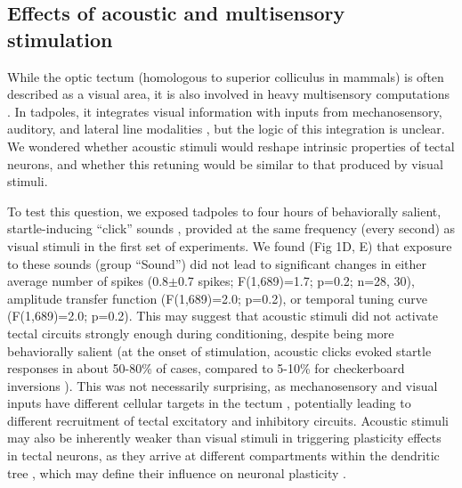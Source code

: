 \documentclass{article}
\begin{document}
\subsection*{Effects of acoustic and multisensory stimulation}

While the optic tectum (homologous to superior colliculus in mammals) is often described as a visual area, it is also involved in heavy multisensory computations \citep{stein2014}. In tadpoles, it integrates visual information with inputs from mechanosensory, auditory, and lateral line modalities \citep{deeg2009,pratt2009trigeminal,hiramoto2009,felch2016,truszkowski2017}, but the logic of this integration is unclear. We wondered whether acoustic stimuli would reshape intrinsic properties of tectal neurons, and whether this retuning would be similar to that produced by visual stimuli. 

To test this question, we exposed tadpoles to four hours of behaviorally salient, startle-inducing “click” sounds \citep{james2015,truszkowski2017}, provided at the same frequency (every second) as visual stimuli in the first set of experiments. We found (Fig 1D, E) that exposure to these sounds (group “Sound”) did not lead to significant changes in either average number of spikes (0.8$\pm$0.7 spikes; F(1,689)=1.7; p=0.2; n=28, 30), amplitude transfer function (F(1,689)=2.0; p=0.2), or temporal tuning curve (F(1,689)=2.0; p=0.2). This may suggest that acoustic stimuli did not activate tectal circuits strongly enough during conditioning, despite being more behaviorally salient (at the onset of stimulation, acoustic clicks evoked startle responses in about 50-80\% of cases, compared to 5-10\% for checkerboard inversions \citep{james2015, truszkowski2017}). This was not necessarily surprising, as mechanosensory and visual inputs have different cellular targets in the tectum \citep{pratt2009trigeminal, felch2016, truszkowski2017}, potentially leading to different recruitment of tectal excitatory and inhibitory circuits. Acoustic stimuli may also be inherently weaker than visual stimuli in triggering plasticity effects in tectal neurons, as they arrive at different compartments within the dendritic tree \citep{hiramoto2009, deeg2009}, which may define their influence on neuronal plasticity \citep{richards2019dendritic}.
\end{document}

